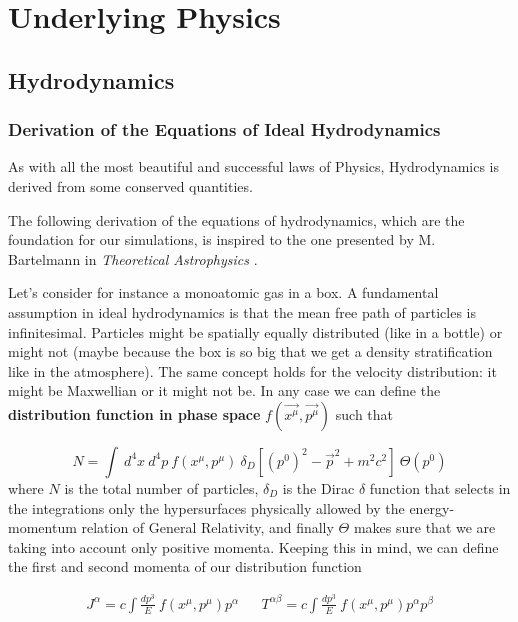 
\chapter{Underlying Physics}
\section{Hydrodynamics}
\subsection{Derivation of the Equations of Ideal Hydrodynamics}
As with all the most beautiful and successful laws of Physics, Hydrodynamics is derived from some conserved quantities. 

The following derivation of the equations of hydrodynamics, which are the foundation for our simulations, is inspired to the one presented by M. Bartelmann in \textit{Theoretical Astrophysics} \cite{theoastro}. 

Let's consider for instance a monoatomic gas in a box. A fundamental assumption in ideal hydrodynamics is that the mean free path of particles is infinitesimal. Particles might be spatially equally distributed (like in a bottle) or might not (maybe because the box is so big that we get a density stratification like in the atmosphere). The same concept holds for the velocity distribution: it might be Maxwellian or it might not be. 
In any case we can define the \textbf{distribution function in phase space} $f( \vec{x^{\mu}}, \vec{p^{\mu}})$ such that

$$N=\int \ d^4x \ d^4p \ f( x^{\mu}, p^{\mu}) \  \delta_D[(p^0)^2-\vec{p}^2+m^2c^2] \  \Theta(p^0)$$ 
 where $N$ is the total number of particles, $\delta_D$ is the Dirac $\delta$ function that selects in the integrations only the hypersurfaces physically allowed by the energy-momentum relation of General Relativity, and finally $\Theta$ makes sure that we are taking into account only positive momenta. 
Keeping this in mind, we can define the first and second momenta of our distribution function

\begin{align}
J^{\alpha}= c \int \frac{dp^3}{E} \ f( x^{\mu}, p^{\mu}) p^{\alpha}  &&   T^{\alpha \beta}= c \int \frac{dp^3}{E} \ f( x^{\mu}, p^{\mu}) p^{\alpha}p^{\beta}  
\end{align}
 
